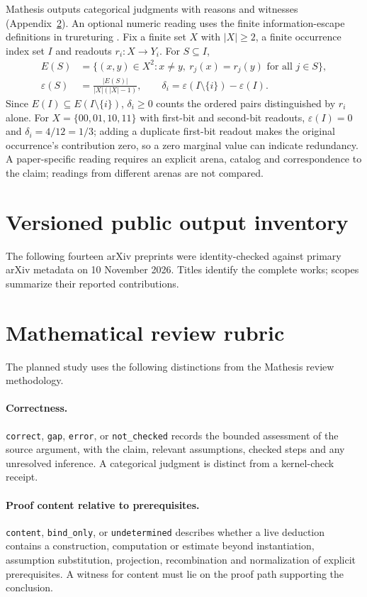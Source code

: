 \documentclass[11pt]{article}
\newcommand{\status}[1]{\texttt{#1}}
\begin{document}
Mathesis outputs categorical judgments with reasons and witnesses
(Appendix~\ref{app:rubric}). An optional numeric reading uses the finite
information-escape definitions in trureturing \citep{escape}. Fix a finite
set $X$ with $|X|\geq2$, a finite occurrence index set $I$ and readouts
$r_i:X\to Y_i$. For $S\subseteq I$,
\begin{align}
 E(S)&=\{(x,y)\in X^2:x\ne y,\ r_j(x)=r_j(y)\text{ for all }j\in S\},
 \label{eq:pairs}\\
 \varepsilon(S)&=\frac{|E(S)|}{|X|(|X|-1)},\qquad
 \delta_i=\varepsilon(I\setminus\{i\})-\varepsilon(I).
 \label{eq:escape}
\end{align}
Since $E(I)\subseteq E(I\setminus\{i\})$, $\delta_i\geq0$ counts the ordered
pairs distinguished by $r_i$ alone. For $X=\{00,01,10,11\}$ with first-bit and
second-bit readouts, $\varepsilon(I)=0$ and $\delta_i=4/12=1/3$; adding a
duplicate first-bit readout makes the original occurrence's contribution
zero, so a zero marginal value can indicate redundancy. A paper-specific
reading requires an explicit arena, catalog and correspondence to the claim;
readings from different arenas are not compared.

\section{Versioned public output inventory}
\label{app:inventory}
The following fourteen arXiv preprints were identity-checked against primary
arXiv metadata on 10 November 2026. Titles identify the complete works; scopes
summarize their reported contributions.


\section{Mathematical review rubric}
\label{app:rubric}
The planned study uses the following distinctions from the Mathesis review
methodology.

\paragraph{Correctness.}
\status{correct}, \status{gap}, \status{error}, or \status{not\_checked}
records the bounded assessment of the source argument, with the claim,
relevant assumptions, checked steps and any unresolved inference. A
categorical judgment is distinct from a kernel-check receipt.

\paragraph{Proof content relative to prerequisites.}
\status{content}, \status{bind\_only}, or \status{undetermined} describes
whether a live deduction contains a construction, computation or estimate
beyond instantiation, assumption substitution, projection, recombination and
normalization of explicit prerequisites. A witness for content must lie on
the proof path supporting the conclusion.
\end{document}

